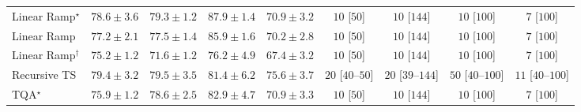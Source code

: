 \begin{tabular}{l|cccc|cccc|}
Linear Ramp$^\star$ & {\cellcolor[HTML]{8B61AC}} \color[HTML]{F1F1F1} $78.6\pm 3.6$ & {\cellcolor[HTML]{8A5AA9}} \color[HTML]{F1F1F1} $79.3\pm 1.2$ & {\cellcolor[HTML]{760C71}} \color[HTML]{F1F1F1} $87.9\pm 1.4$ & {\cellcolor[HTML]{94A6CE}} \color[HTML]{F1F1F1} $70.9\pm 3.2$ & {\cellcolor[HTML]{FFF7F3}} \color[HTML]{000000} $10$ [$50$] & {\cellcolor[HTML]{FFF7F3}} \color[HTML]{000000} $10$ [$144$] & {\cellcolor[HTML]{FFF7F3}} \color[HTML]{000000} $10$ [$100$] & {\cellcolor[HTML]{FFF7F3}} \color[HTML]{000000} $7$ [$100$] \\
Linear Ramp & {\cellcolor[HTML]{8C6EB3}} \color[HTML]{F1F1F1} $77.2\pm 2.1$ & {\cellcolor[HTML]{8C6CB1}} \color[HTML]{F1F1F1} $77.5\pm 1.4$ & {\cellcolor[HTML]{821982}} \color[HTML]{F1F1F1} $85.9\pm 1.6$ & {\cellcolor[HTML]{96ACD2}} \color[HTML]{F1F1F1} $70.2\pm 2.8$ & {\cellcolor[HTML]{FFF7F3}} \color[HTML]{000000} $10$ [$50$] & {\cellcolor[HTML]{FFF7F3}} \color[HTML]{000000} $10$ [$144$] & {\cellcolor[HTML]{FFF7F3}} \color[HTML]{000000} $10$ [$100$] & {\cellcolor[HTML]{FFF7F3}} \color[HTML]{000000} $7$ [$100$] \\
Linear Ramp$^\dagger$ & {\cellcolor[HTML]{8C80BB}} \color[HTML]{F1F1F1} $75.2\pm 1.2$ & {\cellcolor[HTML]{91A0CB}} \color[HTML]{F1F1F1} $71.6\pm 1.2$ & {\cellcolor[HTML]{8C78B7}} \color[HTML]{F1F1F1} $76.2\pm 4.9$ & {\cellcolor[HTML]{A4C0DC}} \color[HTML]{000000} $67.4\pm 3.2$ & {\cellcolor[HTML]{FFF7F3}} \color[HTML]{000000} $10$ [$50$] & {\cellcolor[HTML]{FFF7F3}} \color[HTML]{000000} $10$ [$144$] & {\cellcolor[HTML]{FFF7F3}} \color[HTML]{000000} $10$ [$100$] & {\cellcolor[HTML]{FFF7F3}} \color[HTML]{000000} $7$ [$100$] \\
Recursive TS & {\cellcolor[HTML]{8A5AA9}} \color[HTML]{F1F1F1} $79.4\pm 3.2$ & {\cellcolor[HTML]{8A59A8}} \color[HTML]{F1F1F1} $79.5\pm 3.5$ & {\cellcolor[HTML]{8948A0}} \color[HTML]{F1F1F1} $81.4\pm 6.2$ & {\cellcolor[HTML]{8C7DBA}} \color[HTML]{F1F1F1} $75.6\pm 3.7$ & {\cellcolor[HTML]{FFF4F0}} \color[HTML]{000000} $20$ [$40$--$50$] & {\cellcolor[HTML]{FFF4F0}} \color[HTML]{000000} $20$ [$39$--$144$] & {\cellcolor[HTML]{FEEEEA}} \color[HTML]{000000} $50$ [$40$--$100$] & {\cellcolor[HTML]{FFF6F2}} \color[HTML]{000000} $11$ [$40$--$100$] \\
TQA$^\star$ & {\cellcolor[HTML]{8C7AB8}} \color[HTML]{F1F1F1} $75.9\pm 1.2$ & {\cellcolor[HTML]{8B61AC}} \color[HTML]{F1F1F1} $78.6\pm 2.5$ & {\cellcolor[HTML]{873A98}} \color[HTML]{F1F1F1} $82.9\pm 4.7$ & {\cellcolor[HTML]{94A6CE}} \color[HTML]{F1F1F1} $70.9\pm 3.3$ & {\cellcolor[HTML]{FFF7F3}} \color[HTML]{000000} $10$ [$50$] & {\cellcolor[HTML]{FFF7F3}} \color[HTML]{000000} $10$ [$144$] & {\cellcolor[HTML]{FFF7F3}} \color[HTML]{000000} $10$ [$100$] & {\cellcolor[HTML]{FFF7F3}} \color[HTML]{000000} $7$ [$100$] \\

\end{tabular}
